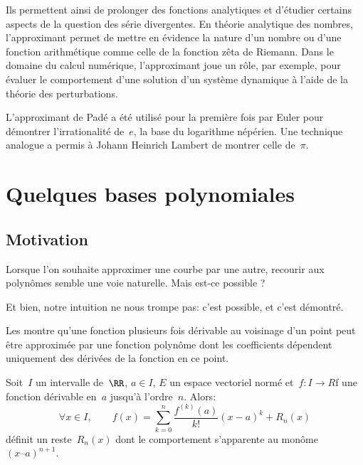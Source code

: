 Ils permettent ainsi de prolonger des fonctions analytiques et d'étudier certains aspects de la question des 
série divergentes.
En théorie analytique des nombres, l'approximant permet de mettre en évidence la nature d'un nombre ou 
d'une fonction arithmétique comme celle de la fonction zêta de Riemann. 
Dans le domaine du calcul numérique, l'approximant joue un rôle, par exemple, pour évaluer le comportement 
d'une solution d'un système dynamique à l'aide de la théorie des perturbations.

L'approximant de Padé a été utilisé pour la première fois par Euler 
pour démontrer l'irrationalité de~$e$, la base du logarithme népérien. 
Une technique analogue a permis à Johann Heinrich Lambert 
de montrer celle de~$\pi$.%







\medskip
\section{Quelques bases polynomiales}

\medskip
\subsection{Motivation}

Lorsque l'on souhaite approximer une courbe par une autre, recourir aux polynômes semble
une voie naturelle.
Mais est-ce possible ?

\medskip
Et bien, notre intuition ne nous trompe pas: c'est possible, et c'est démontré.

Les 
montre qu'une fonction plusieurs fois dérivable au voisinage d'un point peut être approximée 
par une fonction polynôme dont les coefficients dépendent uniquement des dérivées de la fonction 
en ce point.

\begin{theoreme}
Soit~$I$ un intervalle de~$\RR$, $a\in I$, $E$ un espace vectoriel normé et~$f: I\rightarrow R$f une fonction dérivable en~$a$ 
jusqu’à l’ordre~$n$. Alors:
\begin{equation}
\forall x\in I, \qquad
f(x) =\sum_{k=0}^n \frac{f^{(k)}(a)}{k!}(x-a)^k + R_n(x)
\end{equation}
définit un reste~$R_n(x)$ dont le comportement s’apparente au monôme~$(x – a)^{n + 1}$.
\end{theoreme}

